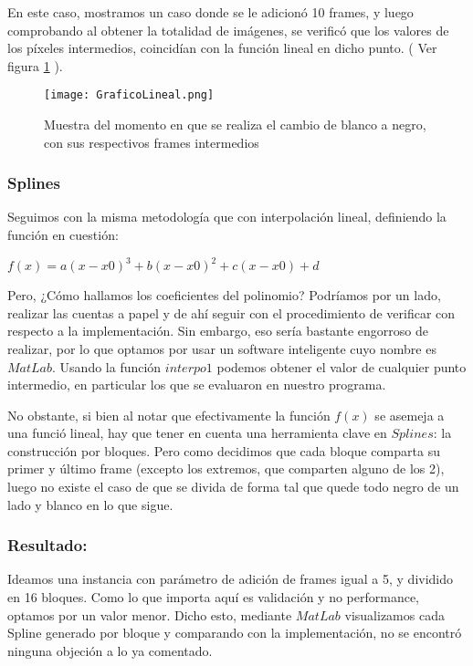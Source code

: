 En este caso, mostramos un caso donde se le adicion\'o 10 frames, y luego comprobando al obtener la totalidad de im\'agenes, se verific\'o que los valores de los p\'ixeles intermedios, coincid\'ian con la funci\'on lineal en dicho punto. ( Ver figura \ref{fig:linealValidacion} ).


\begin{figure}[h!]
  \centering
    \texttt{[image: GraficoLineal.png]}
     \caption{Muestra del momento en que se realiza el cambio de blanco a negro, con sus respectivos frames intermedios}\label{fig:linealValidacion}
\end{figure}
\noindent

\subsubsection*{Splines}

Seguimos con la misma metodolog\'ia que con interpolaci\'on lineal, definiendo la funci\'on en cuesti\'on:

$f(x) = a (x - x0)^3 + b ( x - x0)^2 + c ( x - x0) + d$

Pero, ¿C\'omo hallamos los coeficientes del polinomio? Podr\'iamos por un lado, realizar las cuentas a papel y  de ah\'i seguir con el procedimiento de verificar con respecto a la implementaci\'on. Sin embargo, eso ser\'ia  bastante engorroso de realizar, por lo que optamos por usar un software inteligente cuyo nombre es $MatLab$. Usando la funci\'on $interpo1$ podemos obtener el valor de cualquier punto intermedio, en particular los que se evaluaron en nuestro programa.

No obstante, si bien al notar que efectivamente la funci\'on $f(x)$ se asemeja a una funci\'o lineal, hay que tener en cuenta una herramienta clave en $Splines$: la construcci\'on por bloques. Pero como decidimos que cada bloque comparta su primer y \'ultimo frame (excepto los extremos, que comparten alguno de los 2), luego no existe el caso de que se divida de forma tal que quede todo negro de un lado y blanco en lo que sigue.

\subsubsection*{\bf{Resultado:}}

Ideamos una instancia con par\'ametro de adici\'on de frames igual a 5, y dividido en 16 bloques. Como lo que importa aqu\'i es validaci\'on y no performance, optamos por un valor menor. Dicho esto, mediante $MatLab$ visualizamos cada Spline generado por bloque y comparando con la implementaci\'on, no se encontr\'o ninguna objeci\'on a lo ya comentado.

